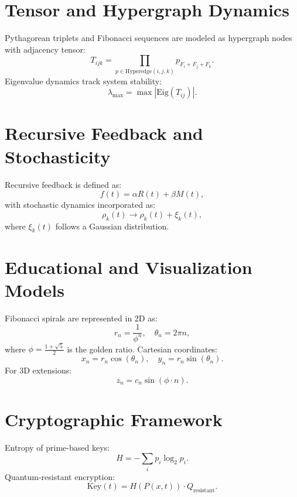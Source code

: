 \documentclass[11pt]{article}
\begin{document}
\section{Tensor and Hypergraph Dynamics}
Pythagorean triplets and Fibonacci sequences are modeled as hypergraph nodes with adjacency tensor:
\begin{equation}
    T_{ijk} = \prod_{p \in \text{Hyperedge}(i,j,k)} p_{F_i + F_j + F_k}.
\end{equation}
Eigenvalue dynamics track system stability:
\begin{equation}
    \lambda_{\text{max}} = \max |\text{Eig}(T_{ij})|.
\end{equation}

\section{Recursive Feedback and Stochasticity}
Recursive feedback is defined as:
\begin{equation}
    f(t) = \alpha R(t) + \beta M(t),
\end{equation}
with stochastic dynamics incorporated as:
\begin{equation}
    \rho_k(t) \to \rho_k(t) + \xi_k(t),
\end{equation}
where $\xi_k(t)$ follows a Gaussian distribution.

\section{Educational and Visualization Models}
Fibonacci spirals are represented in 2D as:
\begin{equation}
    r_n = \frac{1}{\phi^n}, \quad \theta_n = 2\pi n,
\end{equation}
where $\phi = \frac{1 + \sqrt{5}}{2}$ is the golden ratio. Cartesian coordinates:
\begin{equation}
    x_n = r_n \cos(\theta_n), \quad y_n = r_n \sin(\theta_n).
\end{equation}
For 3D extensions:
\begin{equation}
    z_n = c_n \sin(\phi \cdot n).
\end{equation}

\section{Cryptographic Framework}
Entropy of prime-based keys:
\begin{equation}
    H = - \sum_{i} p_i \log_2 p_i.
\end{equation}
Quantum-resistant encryption:
\begin{equation}
    \text{Key}(t) = H(P(x, t)) \cdot Q_{\text{resistant}}.
\end{equation}
\end{document}
